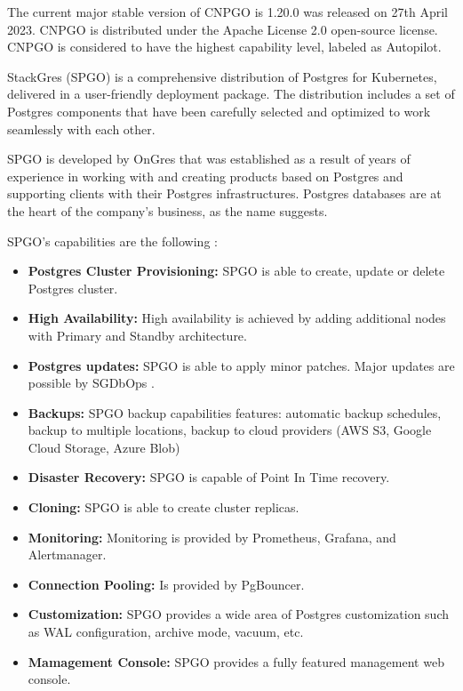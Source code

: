 
The current major stable version of CNPGO is 1.20.0 was released on 27th April 2023. \cite{CNPGreleases} CNPGO is distributed under the Apache License 2.0 open-source license. CNPGO is considered to have the highest capability level, labeled as Autopilot. \cite{CNPGdocu}

StackGres (SPGO) is a comprehensive distribution of Postgres for Kubernetes, delivered in a user-friendly deployment package. The distribution includes a set of Postgres components that have been carefully selected and optimized to work seamlessly with each other. \cite{SPGOgitlab}

SPGO is developed by OnGres that was established as a result of years of experience in working with and creating products based on Postgres and supporting clients with their Postgres infrastructures. Postgres databases are at the heart of the company's business, as the name suggests. \cite{OnGres}

SPGO’s capabilities are the following \cite{OnGres}:
\begin{itemize}
    \item \textbf{Postgres Cluster Provisioning:} SPGO is able to create, update or delete Postgres cluster.
    \item \textbf{High Availability:} High availability is achieved by adding additional nodes with Primary and Standby architecture.
    \item \textbf{Postgres updates:} SPGO is able to apply minor patches. Major updates are possible by SGDbOps \cite{SPGODocuMajorUpdates}.
    \item \textbf{Backups:} SPGO backup capabilities features: automatic backup schedules, backup to multiple locations, backup to cloud providers (AWS S3, Google Cloud Storage, Azure Blob)
    \item \textbf{Disaster Recovery:} SPGO is capable of Point In Time recovery.
    \item \textbf{Cloning:} SPGO is able to create cluster replicas.
    \item \textbf{Monitoring:} Monitoring is provided by Prometheus, Grafana, and Alertmanager.
    \item \textbf{Connection Pooling:} Is provided by PgBouncer.
    \item \textbf{Customization:} SPGO provides a wide area of Postgres customization such as WAL configuration, archive mode, vacuum, etc. \cite{SPGODocuCustomization}
    \item \textbf{Mamagement Console:} SPGO provides a fully featured management web console.

\end{itemize}

